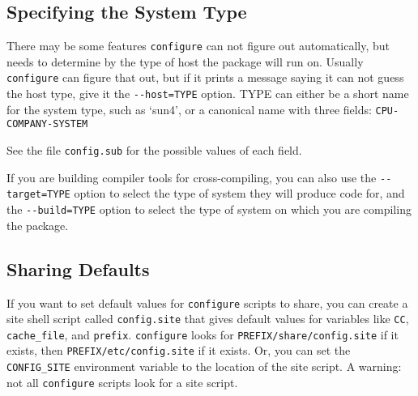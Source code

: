 \begin{appendix}
\subsection*{Specifying the System Type}


   There may be some features \verb+configure+ can not figure out
automatically, but needs to determine by the type of host the package
will run on.  Usually \verb+configure+ can figure that out, but if it prints
a message saying it can not guess the host type, give it the
\verb+--host=TYPE+ option.  TYPE can either be a short name for the system
type, such as `sun4', or a canonical name with three fields: 
\verb+CPU-COMPANY-SYSTEM+

See the file \verb+config.sub+ for the possible values of each field. 
 
   If you are building compiler tools for cross-compiling, you can also
use the \verb+--target=TYPE+ option to select the type of system they will
produce code for, and the \verb+--build=TYPE+ option to select the type of
system on which you are compiling the package.

\subsection*{Sharing Defaults}
   If you want to set default values for \verb+configure+ scripts to share,
you can create a site shell script called \verb+config.site+ that gives
default values for variables like \verb+CC+,  \verb+cache_file+, and 
\verb+prefix+.
\verb+configure+ looks for \verb+PREFIX/share/config.site+ if it exists, then
\verb+PREFIX/etc/config.site+ if it exists.  Or, you can set the
\verb+CONFIG_SITE+ environment variable to the location of the site script.
A warning: not all \verb+configure+ scripts look for a site script.










\end{appendix}


